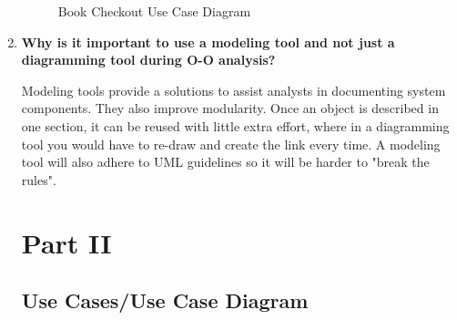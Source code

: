 \documentclass{article}
\begin{document}
\begin{enumerate}
\begin{figure}[H]
    \caption{Book Checkout Use Case Diagram}
  \end{figure}

  \item \textbf{Why is it important to use a modeling tool and not just a diagramming tool during O-O analysis?}

  Modeling tools provide a solutions to assist analysts in documenting system components. They also
  improve modularity. Once an object is described in one section, it can be reused with little extra 
  effort, where in a diagramming tool you would have to re-draw and create the link every time. A modeling
  tool will also adhere to UML guidelines so it will be harder to "break the rules".


\newpage

\section{Part II}

\subsection{Use Cases/Use Case Diagram}


\end{enumerate}
\end{document}
